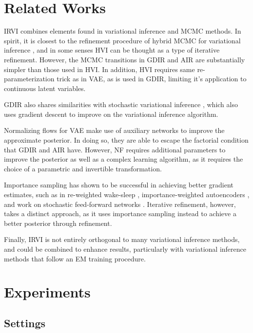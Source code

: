\documentclass{article} %
\begin{document}
\section{Related Works}
IRVI combines elements found in variational inference and MCMC methods. In
spirit, it is closest to the refinement procedure of hybrid MCMC for variational
inference \citep[HVI,][]{icml2015_salimans15}, and in some senses HVI can be thought as a type of iterative refinement. However, the MCMC transitions in GDIR and AIR are substantially simpler than those used in HVI. In addition, HVI
requires same re-parameterization trick as in VAE, as is used in GDIR, limiting it's application to continuous latent variables.

GDIR also shares similarities with stochastic variational inference
\citep{hoffman2013stochastic}, which also uses gradient descent to improve on the
variational inference algorithm. 

Normalizing flows for VAE \citep[NF,][]{rezende2015variational} make use of auxiliary
networks to improve the approximate posterior. In doing so, they are able to
escape the factorial condition that GDIR and AIR have. However, NF requires
additional parameters to improve the posterior as well as a complex learning
algorithm, as it requires the choice of a parametric and invertible transformation.

Importance sampling has shown to be successful in achieving better gradient
estimates, such as in re-weighted wake-sleep \citep[RWS,
][]{bornschein2014reweighted}, importance-weighted autoencoders
\citep[IWAE,][]{burda2015importance}, and work on stochastic feed-forward
networks \citep[SFFN, ][]{tang2013learning}. Iterative refinement, however, takes a distinct approach, as it uses
importance sampling instead to achieve a better posterior through refinement.

Finally, IRVI is not entirely orthogonal to many variational inference methods, and could be combined to enhance results, particularly with variational inference methods that follow an EM training procedure.

\section{Experiments}

\subsection{Settings}
\end{document}
